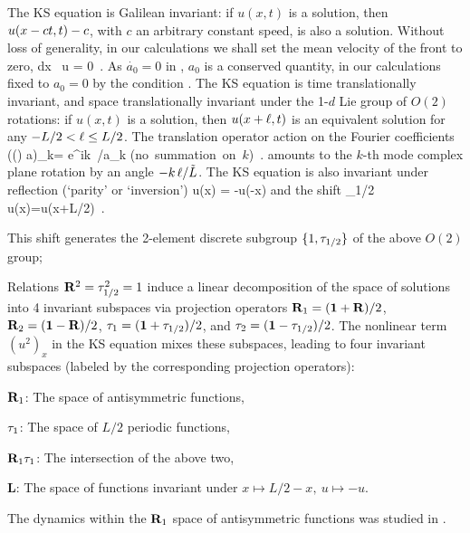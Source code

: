 The  KS equation is Galilean invariant: if $u(x,t)$ is a solution,
then $u(x -ct,t) -c $, with $c$ an arbitrary constant
speed, is also a solution. Without loss of generality, in our
calculations we shall set the mean velocity of the front to zero,
\beq \int dx \, u = 0 \,. 
As $\dot{a_0}=0$ in
, $a_0$ is a conserved quantity, in our calculations
fixed to $a_0=0$ by the
condition . The KS equation   is time
translationally invariant, and space translationally invariant under
the 1-$d$ Lie group of $O(2)$ rotations: if $u(x,t)$ is a solution,
then $u(x+\shift,t)$ is an equivalent solution for any $-L/2 <
\shift \leq L/2$.
The translation operator action on the Fourier coefficients
\beq
  ((\shift) a)_k= e^{ik\, \shift /\tildeL}a_k
    \qquad \mbox{(no summation on $k$)}
    \,.
    \label{eq:RPOcondFouri}
\eeq amounts to the $k$-th mode complex plane rotation by an angle
$-k\, \ell /\tilde{L}$. The KS equation is also invariant under
reflection (`parity' or `inversion')
\beq \Refl u(x) = -u(-x)
and the shift
\beq \Shift_{1/2} u(x)=u(x+L/2) \,.

This shift generates the 2-element discrete subgroup
$\{1,\tau_{1/2}\}$ of the above $O(2)$ group;


Relations $\mathbf{R}^2=\tau_{1/2}^2=1$ induce a linear decomposition
of the space of solutions into 4 invariant subspaces via
projection operators $\mathbf{R}_1=(\mathbf 1+\mathbf{R})/2$,
$\mathbf{R}_2=(\mathbf 1-\mathbf{R})/2$, $\tau_1=(\mathbf 1+\tau_{1/2})/2$, and
$\tau_2=(\mathbf 1-\tau_{1/2})/2$.  The nonlinear term $(u^2)_x$ in
the KS equation mixes these subspaces, leading
to four invariant subspaces (labeled by the
corresponding projection operators):
\begin{romannum} %
 \item[$\mathbf{R}_1$:] The space of antisymmetric functions,
 \item[$\tau_1$:] The space of $L/2$ periodic functions,
 \item[$\mathbf{R}_1 \tau_1$:] The intersection of the above two,
 \item[$\mathbf{L}$:] The space of functions invariant under $x\mapsto L/2-x,\ u\mapsto -u$.
\end{romannum} %
The dynamics within the $\mathbf{R}_1$ space of antisymmetric functions
was studied in .

